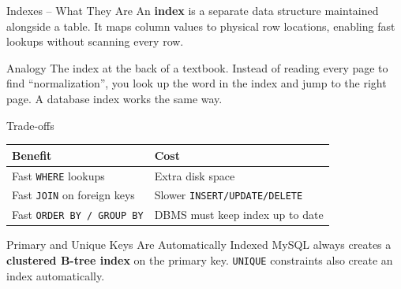 \begin{frame}{Indexes -- What They Are}
  An \textbf{index} is a separate data structure maintained alongside a table.
  It maps column values to physical row locations, enabling fast lookups
  without scanning every row.

  \begin{block}{Analogy}
    The index at the back of a textbook. Instead of reading every page to find
    ``normalization'', you look up the word in the index and jump to the right
    page. A database index works the same way.
  \end{block}

  \begin{block}{Trade-offs}
    \begin{tabular}{@{}ll@{}}
      \toprule
      \textbf{Benefit} & \textbf{Cost} \\
      \midrule
      Fast \texttt{WHERE} lookups              & Extra disk space \\
      Fast \texttt{JOIN} on foreign keys       & Slower \texttt{INSERT/UPDATE/DELETE} \\
      Fast \texttt{ORDER BY / GROUP BY}        & DBMS must keep index up to date \\
      \bottomrule
    \end{tabular}
  \end{block}

  \begin{alertblock}{Primary and Unique Keys Are Automatically Indexed}
    MySQL always creates a \textbf{clustered B-tree index} on the primary key.
    \texttt{UNIQUE} constraints also create an index automatically.
  \end{alertblock}
\end{frame}

